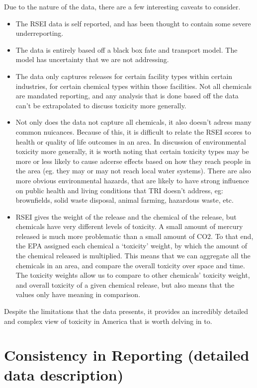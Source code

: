 \documentclass[12pt,twoside]{dukestatscithesis}
\theoremstyle{definition}
\theoremstyle{definition}
\theoremstyle{definition}
\theoremstyle{remark}
\begin{document}
Due to the nature of the data, there are a few interesting caveats to
consider.
\begin{itemize}
\item
  The RSEI data is self reported, and has been thought to contain some
  severe underreporting.
\item
  The data is entirely based off a black box fate and transport model.
  The model has uncertainty that we are not addressing.
\item
  The data only captures releases for certain facility types within
  certain industries, for certain chemical types within those
  facilities. Not all chemicals are mandated reporting, and any analysis
  that is done based off the data can't be extrapolated to discuss
  toxicity more generally.
\item
  Not only does the data not capture all chemicals, it also doesn't
  adress many common nuicances. Because of this, it is difficult to
  relate the RSEI scores to health or quality of life outcomes in an
  area. In discussion of environmental toxicity more generally, it is
  worth noting that certain toxicity types may be more or less likely to
  cause adcerse effects based on how they reach people in the area (eg.
  they may or may not reach local water systems). There are also more
  obvious environmental hazards, that are likely to have strong
  influence on public health and living conditions that TRI doesn't
  address, eg: brownfields, solid waste disposal, animal farming,
  hazardous waste, etc.
\item
  RSEI gives the weight of the release and the chemical of the release,
  but chemicals have very different levels of toxicity. A small amount
  of mercury released is much more problematic than a small amount of
  CO2. To that end, the EPA assigned each chemical a `toxicity' weight,
  by which the amount of the chemical released is multiplied. This means
  that we can aggregate all the chemicals in an area, and compare the
  overall toxicity over space and time. The toxicity weights allow us to
  compare to other chemicals' toxicity weight, and overall toxicity of a
  given chemical release, but also means that the values only have
  meaning in comparison.
\end{itemize}
Despite the limitations that the data presents, it provides an
incredibly detailed and complex view of toxicity in America that is
worth delving in to.

\section{Consistency in Reporting (detailed data
description)}\label{consistency-in-reporting-detailed-data-description}
\end{document}
